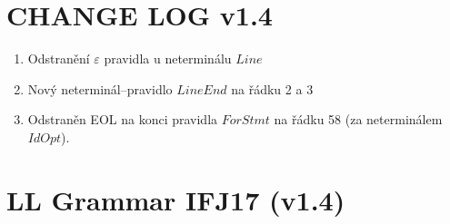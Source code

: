 \documentclass[a4paper,11pt,landscape,leqno]{article}
\begin{document}
\section{CHANGE LOG v1.4}
\begin{enumerate}
\item{Odstranění $\varepsilon$ pravidla u neterminálu $Line$}
\item{Nový neterminál--pravidlo $LineEnd$ na řádku 2 a 3}
\item{Odstraněn EOL na konci pravidla $ForStmt$ na řádku 58 (za neterminálem $IdOpt$).}
\end{enumerate}
\section{LL Grammar IFJ17 (v1.4)}
\end{document}
